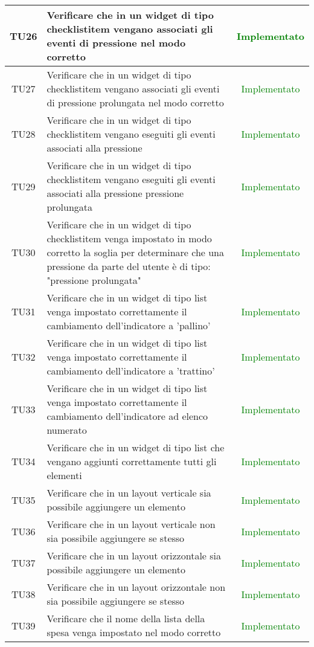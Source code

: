 \begin{center}
\begin{longtable}{|c|>{\centering}m{10cm}|c|}
		TU26 & Verificare che in un widget di tipo checklistitem vengano associati gli eventi di pressione nel modo corretto & \textcolor{Green}{Implementato}\\ \hline
		TU27 & Verificare che in un widget di tipo checklistitem vengano associati gli eventi di pressione prolungata nel modo corretto & \textcolor{Green}{Implementato}\\ \hline
		TU28 & Verificare che in un widget di tipo checklistitem vengano eseguiti gli eventi associati alla pressione & \textcolor{Green}{Implementato}\\ \hline
		TU29 & Verificare che in un widget di tipo checklistitem vengano eseguiti gli eventi associati alla pressione pressione prolungata & \textcolor{Green}{Implementato}\\ \hline
		TU30 & Verificare che in un widget di tipo checklistitem venga impostato in modo corretto la soglia per determinare che una pressione da parte del utente è di tipo: "pressione prolungata" & \textcolor{Green}{Implementato}\\ \hline
		TU31 & Verificare che in un widget di tipo list venga impostato correttamente il cambiamento dell'indicatore a 'pallino' & \textcolor{Green}{Implementato}\\ \hline
		TU32 & Verificare che in un widget di tipo list venga impostato correttamente il cambiamento dell'indicatore a 'trattino' & \textcolor{Green}{Implementato}\\ \hline
		TU33 & Verificare che in un widget di tipo list venga impostato correttamente il cambiamento dell'indicatore ad elenco numerato & \textcolor{Green}{Implementato}\\ \hline
		TU34 & Verificare che in un widget di tipo list che vengano aggiunti correttamente tutti gli elementi & \textcolor{Green}{Implementato}\\ \hline
		TU35 & Verificare che in un layout verticale sia possibile aggiungere un elemento & \textcolor{Green}{Implementato}\\ \hline
		TU36 & Verificare che in un layout verticale non sia possibile aggiungere se stesso & \textcolor{Green}{Implementato}\\ \hline
		TU37 & Verificare che in un layout orizzontale sia possibile aggiungere un elemento & \textcolor{Green}{Implementato}\\ \hline
		TU38 & Verificare che in un layout orizzontale non sia possibile aggiungere se stesso & \textcolor{Green}{Implementato}\\ \hline
		TU39 & Verificare che il nome della lista della spesa venga impostato nel modo corretto & \textcolor{Green}{Implementato}\\ \hline

\end{longtable}
\end{center}
